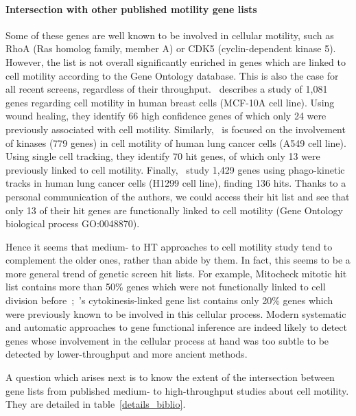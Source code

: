 \paragraph{Intersection with other published motility gene lists}
Some of these genes are well known to be involved in cellular motility, such as RhoA (Ras homolog family, member A) or CDK5 (cyclin-dependent kinase 5). However, the list is not overall significantly enriched in genes which are linked to cell motility according to the Gene Ontology database. This is also the case for all recent screens, regardless of their throughput.~\cite{pmid19160483} describes a study of 1,081 genes regarding cell motility in human breast cells (MCF-10A cell line). Using wound healing, they identify 66 high confidence genes of which only 24 were previously associated with cell motility. Similarly,~\cite{pmid21423205} is focused on the involvement of kinases (779 genes) in cell motility of human lung cancer cells (A549 cell line). Using single cell tracking, they identify 70 hit genes, of which only 13 were previously linked to cell motility. Finally,~\cite{pmid25774502} study 1,429 genes using phago-kinetic tracks in human lung cancer cells (H1299 cell line), finding 136 hits. Thanks to a personal communication of the authors, we could access their hit list and see that only 13 of their hit genes are functionally linked to cell motility (Gene Ontology biological process GO:0048870). 

Hence it seems that medium- to HT approaches to cell motility study tend to complement the older ones, rather than abide by them. In fact, this seems to be a more general trend of genetic screen hit lists. For example, Mitocheck mitotic hit list contains more than 50\% genes which were not functionally linked to cell division before~\cite{pmid20360735};~\cite{pmid15547975}'s cytokinesis-linked gene list contains only 20\% genes which were previously known to be involved in this cellular process. Modern systematic and automatic approaches to gene functional inference are indeed likely to detect genes whose involvement in the cellular process at hand was too subtle to be detected by lower-throughput and more ancient methods.

A question which arises next is to know the extent of the intersection between gene lists from published medium- to high-throughput studies about cell motility. They are detailed in table~\ref{details_biblio}.

